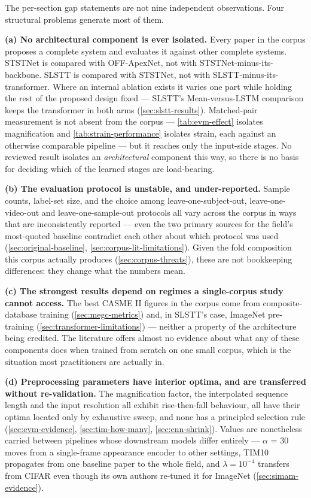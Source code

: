 The per-section gap statements are not nine independent observations. Four structural problems generate most of them.

\textbf{(a) No architectural component is ever isolated.} Every paper in the corpus proposes a complete system and evaluates it against other complete systems. STSTNet is compared with OFF-ApexNet, not with STSTNet-minus-its-backbone. SLSTT is compared with STSTNet, not with SLSTT-minus-its-transformer. Where an internal ablation exists it varies one part while holding the rest of the proposed design fixed --- SLSTT's Mean-versus-LSTM comparison keeps the transformer in both arms (\autoref{sec:slstt-results}). Matched-pair measurement is not absent from the corpus --- \autoref{tab:evm-effect} isolates magnification and \autoref{tab:strain-performance} isolates strain, each against an otherwise comparable pipeline --- but it reaches only the input-side stages. No reviewed result isolates an \textit{architectural} component this way, so there is no basis for deciding which of the learned stages are load-bearing.

\textbf{(b) The evaluation protocol is unstable, and under-reported.} Sample counts, label-set size, and the choice among leave-one-subject-out, leave-one-video-out and leave-one-sample-out protocols all vary across the corpus in ways that are inconsistently reported --- even the two primary sources for the field's most-quoted baseline contradict each other about which protocol was used (\autoref{sec:original-baseline}, \autoref{sec:corpus-lit-limitations}). Given the fold composition this corpus actually produces (\autoref{sec:corpus-threats}), these are not bookkeeping differences: they change what the numbers mean.

\textbf{(c) The strongest results depend on regimes a single-corpus study cannot access.} The best CASME II figures in the corpus come from composite-database training (\autoref{sec:megc-metrics}) and, in SLSTT's case, ImageNet pre-training (\autoref{sec:transformer-limitations}) --- neither a property of the architecture being credited. The literature offers almost no evidence about what any of these components does when trained from scratch on one small corpus, which is the situation most practitioners are actually in.

\textbf{(d) Preprocessing parameters have interior optima, and are transferred without re-validation.} The magnification factor, the interpolated sequence length and the input resolution all exhibit rise-then-fall behaviour, all have their optima located only by exhaustive sweep, and none has a principled selection rule (\autoref{sec:evm-evidence}, \autoref{sec:tim-how-many}, \autoref{sec:cnn-shrink}). Values are nonetheless carried between pipelines whose downstream models differ entirely --- $\alpha$ = 30 moves from a single-frame appearance encoder to other settings, TIM10 propagates from one baseline paper to the whole field, and $\lambda = 10^{-4}$ transfers from CIFAR even though its own authors re-tuned it for ImageNet (\autoref{sec:simam-evidence}).


